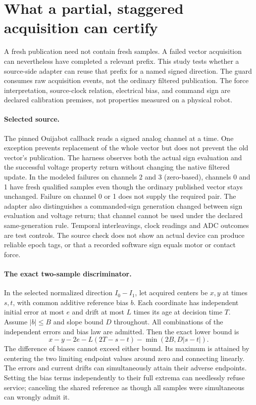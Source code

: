 \documentclass{article}
\begin{document}
\section*{What a partial, staggered acquisition can certify}
A fresh publication need not contain fresh samples. A failed vector
acquisition can nevertheless have completed a relevant prefix. This
study tests whether a source-side adapter can reuse that prefix for
a named signed direction. The guard consumes raw acquisition events,
not the ordinary filtered publication. The force interpretation,
source-clock relation, electrical bias, and command sign are declared
calibration premises, not properties measured on a physical robot.

\paragraph{Selected source.}
The pinned Ouijabot callback reads a signed analog channel at a time.
One exception prevents replacement of the whole vector but does not
prevent the old vector's publication. The harness observes both the
actual sign evaluation and the successful voltage property return
without changing the native filtered update. In the modeled failures
on channels 2 and 3 (zero-based), channels 0 and 1 have fresh qualified
samples even though the ordinary published vector stays unchanged.
Failure on channel 0 or 1 does not supply the required pair. The
adapter also distinguishes a commanded-sign generation changed
between sign evaluation and voltage return; that channel cannot be
used under the declared same-generation rule. Temporal interleavings,
clock readings and ADC outcomes are test controls. The source check
does not show an actual device can produce reliable epoch tags, or
that a recorded software sign equals motor or contact force.

\paragraph{The exact two-sample discriminator.}
In the selected normalized direction $I_0-I_1$, let acquired centers
be $x,y$ at times $s,t$, with common additive reference bias $b$.
Each coordinate has independent initial error at most $e$ and
drift at most $L$ times its age at decision time $T$.
Assume $\lvert b\rvert\le B$ and slope bound $D$ throughout.
All combinations of the independent errors and bias law are admitted.
Then the exact lower bound is
\[
 x-y - 2e - L(2T-s-t) - \min(2B,D\lvert s-t\rvert).
\]
The difference of biases cannot exceed either bound. Its maximum
is attained by centering the two limiting endpoint values around
zero and connecting linearly. The errors and current drifts can
simultaneously attain their adverse endpoints. Setting the bias
terms independently to their full extrema can needlessly refuse
service; canceling the shared reference as though all samples
were simultaneous can wrongly admit it.
\end{document}
